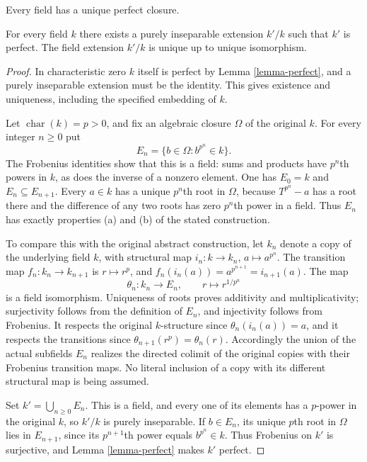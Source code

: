 \begin{lemma}
\label{lemma-perfection}
\begin{slogan}
Every field has a unique perfect closure.
\end{slogan}
For every field $k$ there exists a purely inseparable extension
$k'/k$ such that $k'$ is perfect. The field extension
$k'/k$ is unique up to unique isomorphism.
\end{lemma}

\begin{proof}
In characteristic zero $k$ itself is perfect by
Lemma \ref{lemma-perfect}, and a purely inseparable
extension must be the identity. This gives
existence and uniqueness, including the specified
embedding of $k$.

Let $\operatorname{char}(k)=p>0$, and fix an
algebraic closure $\Omega$ of the original $k$.
For every integer $n\geq0$ put
$$
E_n=\{b\in\Omega:b^{p^n}\in k\}.
$$
The Frobenius identities show that this is a
field: sums and products have $p^n$th powers
in $k$, as does the inverse of a nonzero
element. One has $E_0=k$ and $E_n\subseteq E_{n+1}$.
Every $a\in k$ has a unique $p^n$th root in
$\Omega$, because $T^{p^n}-a$ has a root there
and the difference of any two roots has zero
$p^n$th power in a field. Thus $E_n$ has exactly
properties (a) and (b) of the stated construction.

To compare this with the original abstract
construction, let $k_n$ denote a copy of the
underlying field $k$, with structural map
$i_n:k\to k_n$, $a\mapsto a^{p^n}$.
The transition map $f_n:k_n\to k_{n+1}$ is
$r\mapsto r^p$, and
$f_n(i_n(a))=a^{p^{n+1}}=i_{n+1}(a)$.
The map
$$
\theta_n:k_n\longrightarrow E_n,\qquad
r\longmapsto r^{1/p^n}
$$
is a field isomorphism. Uniqueness of roots
proves additivity and multiplicativity;
surjectivity follows from the definition of
$E_n$, and injectivity follows from Frobenius.
It respects the original $k$-structure since
$\theta_n(i_n(a))=a$, and it respects the
transitions since
$\theta_{n+1}(r^p)=\theta_n(r)$.
Accordingly the union of the actual subfields
$E_n$ realizes the directed colimit of the
original copies with their Frobenius transition
maps. No literal inclusion of a copy with its
different structural map is being assumed.

Set $k'=\bigcup_{n\geq0}E_n$. This is a field,
and every one of its elements has a $p$-power
in the original $k$, so $k'/k$ is purely
inseparable. If $b\in E_n$, its unique $p$th
root in $\Omega$ lies in $E_{n+1}$, since its
$p^{n+1}$th power equals $b^{p^n}\in k$.
Thus Frobenius on $k'$ is surjective, and
Lemma \ref{lemma-perfect} makes $k'$ perfect.


\end{proof}

